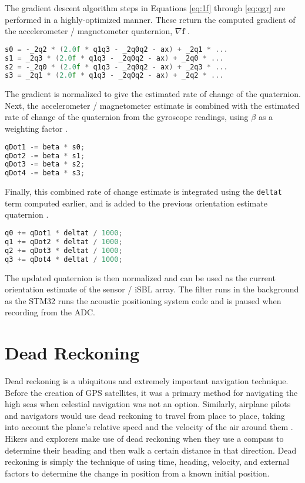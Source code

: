 \documentclass[11pt]{ucthesisCP}
\begin{document}
The gradient descent algorithm steps in Equations \ref{eq:1f} through \ref{eq:qgr} are performed in a highly-optimized manner. These return the computed gradient of the accelerometer / magnetometer quaternion, \(\nabla \mathbf{f}\) \cite{xiotech}.

\begin{lstlisting}[language=C++]
s0 = -_2q2 * (2.0f * q1q3 - _2q0q2 - ax) + _2q1 * ...
s1 = _2q3 * (2.0f * q1q3 - _2q0q2 - ax) + _2q0 * ...	
s2 = -_2q0 * (2.0f * q1q3 - _2q0q2 - ax) + _2q3 * ...
s3 = _2q1 * (2.0f * q1q3 - _2q0q2 - ax) + _2q2 * ...
\end{lstlisting}

The gradient is normalized to give the estimated rate of change of the quaternion. Next, the accelerometer / magnetometer estimate is combined with the estimated rate of change of the quaternion from the gyroscope readings, using \(\beta\) as a weighting factor \cite{xiotech}.

\begin{lstlisting}[language=C++]
qDot1 -= beta * s0;
qDot2 -= beta * s1;
qDot3 -= beta * s2;
qDot4 -= beta * s3;
\end{lstlisting}

Finally, this combined rate of change estimate is integrated using the \verb|deltat| term computed earlier, and is added to the previous orientation estimate quaternion \cite{xiotech}.

\begin{lstlisting}[language=C++]
q0 += qDot1 * deltat / 1000;
q1 += qDot2 * deltat / 1000;
q2 += qDot3 * deltat / 1000;
q3 += qDot4 * deltat / 1000;
\end{lstlisting}

The updated quaternion is then normalized and can be used as the current orientation estimate of the sensor / iSBL array. The filter runs in the background as the STM32 runs the acoustic positioning system code and is paused when recording from the ADC.

\section{Dead Reckoning} \label{sec:4s5}
Dead reckoning is a ubiquitous and extremely important navigation technique. Before the creation of GPS satellites, it was a primary method for navigating the high seas when celestial navigation was not an option. Similarly, airplane pilots and navigators would use dead reckoning to travel from place to place, taking into account the plane’s relative speed and the velocity of the air around them \cite{britdeadreck}. Hikers and explorers make use of dead reckoning when they use a compass to determine their heading and then walk a certain distance in that direction. Dead reckoning is simply the technique of using time, heading, velocity, and external factors to determine the change in position from a known initial position.
\end{document}
